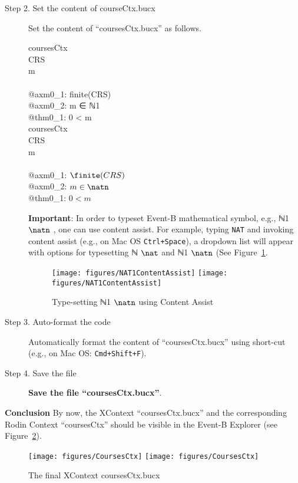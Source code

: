 \begin{description}
\item[Step 2. Set the content of courseCtx.bucx] Set the content of ``coursesCtx.bucx'' as follows.
  \begin{center}
    \begin{Bcode}
      \Bcontext{} coursesCtx\\
      \Bsets{} CRS\\
      \Bconstants{} m\\
      \Baxioms\\
      @axm0_1: finite(CRS)\\
      @axm0_2: m ∈ ℕ1\\
      \Btheorem{} @thm0_1: 0 < m \\
      \Bend
      \else
\Bcontext{} coursesCtx\\
\Bsets{} CRS\\
\Bconstants{} m\\
\Baxioms\\
\Btab @axm0\_1: \(\finite(CRS)\)\\
\Btab @axm0\_2: \(m \in \natn\)\\
\Btab \Btheorem{} @thm0\_1: \(0 < m\)\\
\Bend
       \endif
    \end{Bcode}
  \end{center}
  \textbf{Important}: In order to typeset Event-B mathematical symbol, e.g.,  ℕ1 \else $\natn$ \endif, one can use content assist. For example, typing \texttt{NAT} and invoking content assist (e.g., on Mac OS \texttt{Ctrl+Space}), a dropdown list will appear with options for typesetting  ℕ \else $\nat$ \endif and  ℕ1 \else $\natn$ \endif (See Figure~\ref{fig:NAT1ContentAssist}.
  \begin{figure}[!htbp]
    \centering
    \texttt{[image: figures/NAT1ContentAssist]}
    \else
    \texttt{[image: figures/NAT1ContentAssist]}
    \endif
    \caption{Type-setting  ℕ1 \else $\natn$ \endif using Content Assist}
    \label{fig:NAT1ContentAssist}
  \end{figure}

\item[Step 3. Auto-format the code] Automatically format the content of ``coursesCtx.bucx'' using short-cut (e.g., on Mac OS: \texttt{Cmd+Shift+F}).

\item[Step 4. Save the file] \textbf{Save the file ``coursesCtx.bucx''}.
\end{description}
\textbf{Conclusion} By now, the XContext ``coursesCtx.bucx'' and the corresponding Rodin Context ``coursesCtx'' should be visible in the Event-B Explorer (see Figure~\ref{fig:CoursesCtx}). 
  \begin{figure}[!htbp]
    \centering
    \texttt{[image: figures/CoursesCtx]}
    \else
    \texttt{[image: figures/CoursesCtx]}
    \endif
    \caption{The final XContext coursesCtx.bucx}
    \label{fig:CoursesCtx}
  \end{figure}



